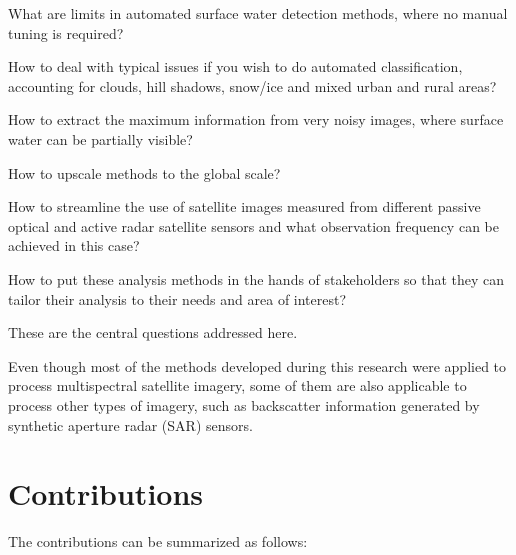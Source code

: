 What are limits in automated surface water detection methods, where no manual tuning is required?

How to deal with typical issues if you wish to do automated classification, accounting for clouds, hill shadows, snow/ice and mixed urban and rural areas?

How to extract the maximum information from very noisy images, where surface water can be partially visible?

How to upscale methods to the global scale?

How to streamline the use of satellite images measured from different passive optical and active radar satellite sensors and what observation frequency can be achieved in this case? 

How to put these analysis methods in the hands of stakeholders so that they can tailor their analysis to their needs and area of interest?

These are the central questions addressed here.

Even though most of the methods developed during this research were applied to process multispectral satellite imagery, some of them are also applicable to process other types of imagery, such as backscatter information generated by synthetic aperture radar (SAR) sensors.

\bigskip

\section{Contributions}

The contributions can be summarized as follows:

